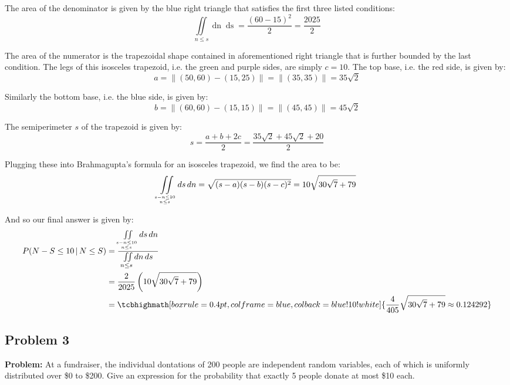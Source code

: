 \documentclass{article}
\newcommand*\pbar[0]{\,|\,}
\begin{document}
The area of the denominator is given by the blue right triangle that satisfies the first three listed conditions:
\begin{equation*}
    \iint\limits_{n\le s}\mathop{dn}\mathop{ds}=\frac{(60-15)^2}{2}=\frac{2025}{2}
\end{equation*}

The area of the numerator is the trapezoidal shape contained in aforementioned right triangle that is further bounded by the last condition. The legs of this isosceles trapezoid, i.e. the green and purple sides, are simply $c=10$. The top base, i.e. the red side, is given by:
\begin{equation*}
    a=\|(50,60)-(15,25)\|=\|(35,35)\|=35\sqrt{2}
\end{equation*}

Similarly the bottom base, i.e. the blue side, is given by:
\begin{equation*}
    b=\|(60,60)-(15,15)\|=\|(45,45)\|=45\sqrt{2}
\end{equation*}

The semiperimeter $s$ of the trapezoid is given by:
\begin{equation*}
    s=\frac{a+b+2c}{2}=\frac{35\sqrt{2}+45\sqrt{2}+20}{2}
\end{equation*}

Plugging these into Brahmagupta's formula for an isosceles trapezoid, we find the area to be:
\begin{equation*}
    \iint\limits_{s-n\le10\atop n\le s}\mathop{ds}\mathop{dn}=\sqrt{(s-a)(s-b)(s-c)^2}=10\sqrt{30\sqrt{7}+79}
\end{equation*}

And so our final answer is given by:
\begin{align*}
    P(N-S\le 10\pbar N\le S)&=\frac{\iint\limits_{s-n\le10\atop n\le s}\mathop{ds}\mathop{dn}}{\iint\limits_{n\le s}\mathop{dn}\mathop{ds}}\\
    &=\frac{2}{2025}\left(10\sqrt{30\sqrt{7}+79}\right)\\
    &=\tcbhighmath[boxrule=0.4pt,colframe=blue,colback=blue!10!white]{\frac{4}{405}\sqrt{30\sqrt{7}+79}\approx0.124292}
\end{align*}

\subsection*{Problem 3}
\noindent\textbf{Problem:} At a fundraiser, the individual dontations of 200 people are independent random variables, each of which is uniformly distributed over \$0 to \$200. Give an expression for the probability that exactly 5 people donate at most \$10 each.
\bigskip
\end{document}
